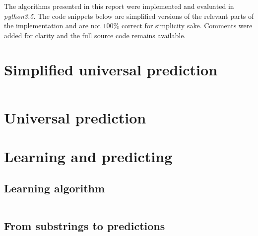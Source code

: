 \documentclass[a4paper,12pt]{article}
\begin{document}
\clearpage
\begin{appendices}

  The algorithms presented in this report were implemented and evaluated
  in \emph{python3.5}. The code snippets below are simplified versions of
  the relevant parts of the implementation and are not $100\%$ correct for
  simplicity sake. Comments were added for clarity and the full source code
  remains available.

  \section{Simplified universal prediction}

    \inputminted[linenos]{python}{code/simplified.py}

  \clearpage
  \section{Universal prediction}

    \lipsum[11-12]

  \clearpage
  \section{Learning and predicting}

    \subsection{Learning algorithm}

      \inputminted[linenos]{python}{code/learning.py}

    \clearpage
    \subsection{From substrings to predictions}

      \inputminted[linenos]{python}{code/predicting.py}

\end{appendices}
\end{document}

